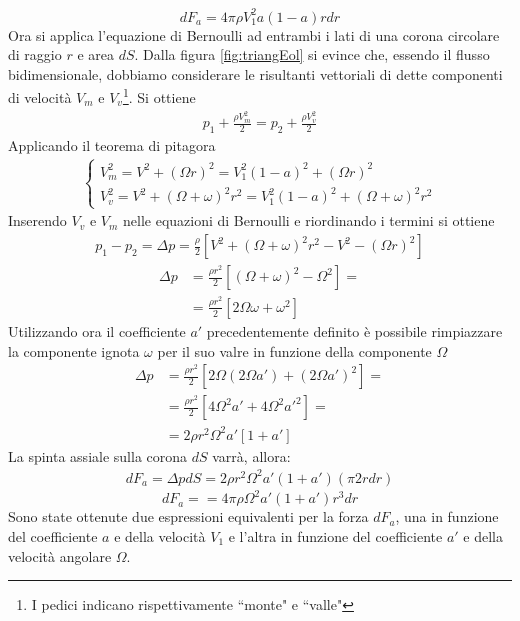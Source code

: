 \begin{equation}\label{eq:forza1}
dF_a = 4 \pi \rho	V_1^2 a \left( 1-a \right) r dr
\end{equation}
Ora si applica l'equazione di Bernoulli ad entrambi i lati di una corona circolare di raggio $r$ e area $dS$. Dalla figura \ref{fig:triangEol} si evince che, essendo il flusso bidimensionale, dobbiamo considerare le risultanti vettoriali di dette componenti di velocità $V_m$ e $V_v$\footnote{I pedici indicano rispettivamente ``monte" e ``valle"}. Si ottiene
\begin{align*}
p_1 + \frac{\rho V_m^2}{2} = p_2 + \frac{\rho V_v^2}{2}
\end{align*}
Applicando il teorema di pitagora
\begin{align*}
\begin{cases}
V_m^2 = V^2 + \left( \Omega r \right)^2 = V_1^2 \left(1-a \right)^2 + \left( \Omega r \right)^2\\
V_v^2 = V^2 + \left( \Omega + \omega \right)^2 r^2= V_1^2 \left(1-a \right)^2 + \left( \Omega + \omega \right)^2 r^2
\end{cases}
\end{align*}
Inserendo $V_v$ e $V_m$ nelle equazioni di Bernoulli e riordinando i termini si ottiene
\begin{align*}
p_1 - p_2 = \Delta p = \frac{\rho}{2} \left[ V^2 + \left( \Omega + \omega \right)^2 r^2 - V^2 - \left( \Omega r \right)^2 \right]
\end{align*}
\begin{align*}
\Delta p &= \frac{\rho r^2}{2} \left[ \left( \Omega + \omega \right)^2 - \Omega^2 \right]= \\
&= \frac{\rho r^2}{2} \left[ 2 \Omega \omega + \omega^2 \right]
\end{align*}
Utilizzando ora il coefficiente $a'$ precedentemente definito è possibile rimpiazzare la componente ignota $\omega$ per il suo valre in funzione della componente $\Omega$
\begin{align*}
\Delta p &= \frac{\rho r^2}{2} \left[ 2 \Omega \left( 2 \Omega a'\right) + \left( 2 \Omega a' \right)^2 \right]=\\
&= \frac{\rho r^2}{2} \left[ 4 \Omega^2 a' + 4 \Omega^2 a'^2 \right] = \\
&= 2 \rho r^2 \Omega^2 a' \left[ 1+a' \right]
\end{align*}
La spinta assiale sulla corona $dS$ varrà, allora:
\begin{align*}
dF_a = \Delta p dS = 2 \rho r^2 \Omega^2 a' \left(1 + a' \right) \left( \pi 2 r dr \right)
\end{align*}
\begin{equation}\label{eq:forza2}
dF_a = = 4 \pi \rho \Omega^2 a' \left( 1+ a' \right) r^3 dr
\end{equation}
Sono state ottenute due espressioni equivalenti per la forza $dF_a$, una in funzione del coefficiente $a$ e della velocità $V_1$ e l'altra in funzione del coefficiente $a'$ e della velocità angolare $\Omega$. 

